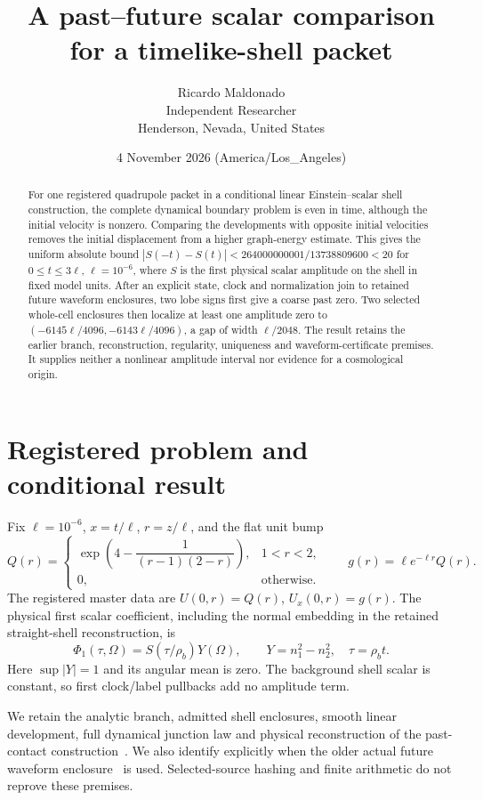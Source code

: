 \documentclass[10pt]{article}
\title{A past--future scalar comparison for a timelike-shell packet}
\author{Ricardo Maldonado\\\small Independent Researcher\\\small Henderson, Nevada, United States}
\date{4 November 2026 (America/Los\_Angeles)}
\begin{document}
\maketitle
\begin{abstract}
For one registered quadrupole packet in a conditional linear Einstein--scalar
shell construction, the complete dynamical boundary problem is even in time,
although the initial velocity is nonzero. Comparing the developments with
opposite initial velocities removes the initial displacement from a higher
graph-energy estimate. This gives the uniform absolute bound
\( |S(-t)-S(t)|<264000000001/13738809600<20 \) for
\(0\le t\le3\ell\), \(\ell=10^{-6}\), where \(S\) is the first physical
scalar amplitude on the shell in fixed model units. After an explicit
state, clock and normalization join to retained future waveform enclosures,
two lobe signs first give a coarse past zero. Two selected whole-cell
enclosures then localize at least one amplitude zero to
\((-6145\ell/4096,-6143\ell/4096)\), a gap of width \(\ell/2048\).
The result retains the earlier branch, reconstruction,
regularity, uniqueness and waveform-certificate premises. It supplies neither
a nonlinear amplitude interval nor evidence for a cosmological origin.
\end{abstract}

\section{Registered problem and conditional result}

Fix \(\ell=10^{-6}\), \(x=t/\ell\), \(r=z/\ell\), and the flat unit bump
\[
 Q(r)=\begin{cases}\exp\!\left(4-\dfrac1{(r-1)(2-r)}\right),&1<r<2,\\0,&\text{otherwise}.\end{cases}
 \qquad g(r)=\ell e^{-\ell r}Q(r).
\]
The registered master data are \(U(0,r)=Q(r)\), \(U_x(0,r)=g(r)\).
The physical first scalar coefficient, including the normal embedding in
the retained straight-shell reconstruction, is
\begin{equation}\label{eq:observation}
 \Phi_1(\tau,\Omega)=S(\tau/\rho_b)Y(\Omega),\qquad
 Y=n_1^2-n_2^2,\quad \tau=\rho_b t.
\end{equation}
Here \(\sup|Y|=1\) and its angular mean is zero. The background shell scalar
is constant, so first clock/label pullbacks add no amplitude term.

We retain the analytic branch, admitted shell enclosures, smooth linear
development, full dynamical junction law and physical reconstruction of
the past-contact construction~\cite{contact}. We also identify explicitly
when the older actual future waveform enclosure~\cite{future} is used.
Selected-source hashing and finite arithmetic do not reprove these premises.
\end{document}
